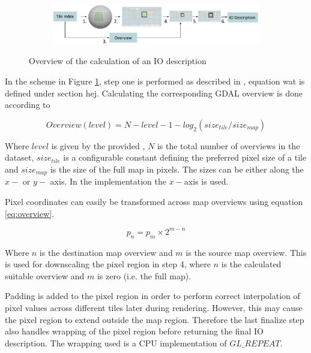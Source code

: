 \begin{figure}[htbp]
    \centering
    \begin{subfigure}[bt]{0.9\textwidth}
        \includegraphics[width=\textwidth]{figures/implementation/pipeline/getiodescription.pdf}
    \end{subfigure}
    \caption{Overview of the calculation of an IO description}
    \label{fig:getiodescription}
\end{figure}

In the scheme in Figure \ref{fig:getiodescription}, step one is performed as described in , equation wat is defined under section hej. 
Calculating the corresponding GDAL overview is done according to

\begin{equation}
\label{eq:overview}
Overview(level) = N - level - 1 - log_2(size_{tile} / size_{map})
\end{equation}

Where $level$ is given by the provided , $N$ is the total number of overviews in the dataset, $size_{tile}$ is a configurable constant defining the preferred pixel size of a tile and $size_{map}$ is the size of the full map in pixels. The sizes can be either along the $x-$ or $y-$ axis. In the implementation the $x-$axis is used.

Pixel coordinates can easily be transformed across map overviews using equation \ref{eq:overview}.

\begin{equation}
\label{eq:overview}
p_{n} = p_{m} \times 2^{m-n}
\end{equation}

Where $n$ is the destination map overview and $m$ is the source map overview. This is used for downscaling the pixel region in step 4, where $n$ is the calculated suitable overview and $m$ is zero (i.e. the full map). 

Padding is added to the pixel region in order to perform correct interpolation of pixel values across different tiles later during rendering. However, this may cause the pixel region to extend outside the map region. Therefore the last finalize step also handles wrapping of the pixel region before returning the final IO description. The wrapping used is a CPU implementation of $GL\_REPEAT$.

